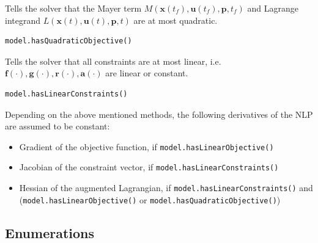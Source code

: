 \documentclass[12pt]{article}
\renewcommand{\v}{\bm}
\begin{document}
\begin{mdframed}[backgroundcolor=gray!10, roundcorner=10pt,
		linewidth=1pt]

	Tells the solver that the Mayer term $M(\v{x}(t_f), \v{u}(t_f),
		\v{p}, t_f)$ and Lagrange integrand $L(\v{x}(t), \v{u}(t),
		\v{p}, t)$ are at
	most quadratic.

	\begin{lstlisting}
model.hasQuadraticObjective()
	\end{lstlisting}
	\label{hasQuadraticObjective}

\end{mdframed}

\begin{mdframed}[backgroundcolor=gray!10, roundcorner=10pt,
		linewidth=1pt]

	Tells the solver that all constraints are at most linear, i.e.
	$\v{f}(\cdot), \v{g}(\cdot), \v{r}(\cdot), \v{a}(\cdot)$ are linear or
	constant.

	\begin{lstlisting}
model.hasLinearConstraints()
		\end{lstlisting}
	\label{hasLinearConstraints}

\end{mdframed}

Depending on the above mentioned methods, the following derivatives of
the NLP are assumed to be constant:

\begin{itemize}
	\item Gradient of the objective function, if
	      \texttt{model.hasLinearObjective()}
	\item Jacobian of the constraint vector, if
	      \texttt{model.hasLinearConstraints()}
	\item Hessian of the augmented Lagrangian, if
	      \texttt{model.hasLinearConstraints()} and
	      (\texttt{model.hasLinearObjective()}
	      or \texttt{model.hasQuadraticObjective()})
\end{itemize}

\subsection{Enumerations}
\end{document}
